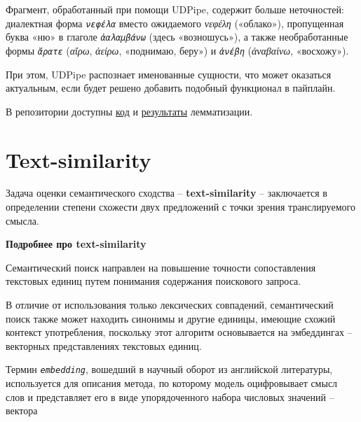 \documentclass[
  letterpaper,
]{book}
\begin{document}
Фрагмент, обработанный при помощи UDPipe, содержит больше неточностей:
диалектная форма \emph{\texttt{νεφέλα}} вместо ожидаемого \emph{νεφέλη}
(«облако»), пропущенная буква «ню» в глаголе \emph{\texttt{ἀαλαμβάνω}}
(здесь «возношусь»), а также необработанные формы \emph{\texttt{ἄρατε}}
(\emph{αἴρω}, \emph{ἀείρω}, «поднимаю, беру») и \emph{\texttt{ἀνέβη}}
(\emph{ἀναβαίνω}, «восхожу»).

При этом, UDPipe распознает именованные сущности, что может оказаться
актуальным, если будет решено добавить подобный функционал в пайплайн.

В репозитории доступны
\href{https://github.com/Drozhzhinastya/GSPC/tree/main/scripts/lemmatization}{код}
и
\href{https://github.com/Drozhzhinastya/GSPC/tree/main/lemmatization/greek}{результаты}
лемматизации.


\hypertarget{sec-about_txt_similarity}{%
\chapter{Text-similarity}\label{sec-about_txt_similarity}}

Задача оценки семантического сходства -- \textbf{text-similarity} --
заключается в определении степени схожести двух предложений с точки
зрения транслируемого смысла.

\begin{tcolorbox}[enhanced jigsaw, toprule=.15mm, colframe=quarto-callout-note-color-frame, colback=white, left=2mm, arc=.35mm, leftrule=.75mm, bottomrule=.15mm, rightrule=.15mm, opacityback=0, breakable]

\textbf{Подробнее про text-similarity}\vspace{2mm}

Семантический поиск направлен на повышение точности сопоставления
текстовых единиц путем понимания содержания поискового запроса.

В отличие от использования только лексических совпадений, семантический
поиск также может находить синонимы и другие единицы, имеющие схожий
контекст употребления, поскольку этот алгоритм основывается на
эмбеддингах -- векторных представлениях текстовых единиц.

Термин \emph{\texttt{embedding}}, вошедший в научный оборот из
английской литературы, используется для описания метода, по которому
модель оцифровывает смысл слов и представляет его в виде упорядоченного
набора числовых значений -- вектора

\end{tcolorbox}
\end{document}
